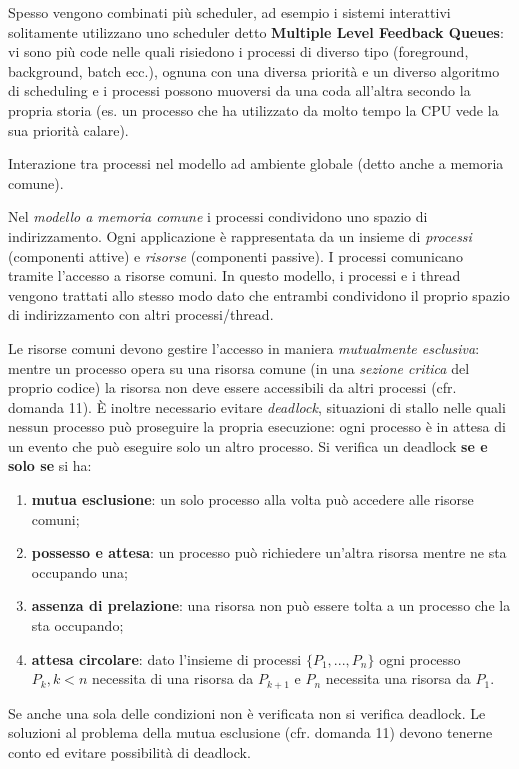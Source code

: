\documentclass[answers,a4paper,12pt]{exam}
\begin{document}
\begin{questions}
\begin{solutionorlines}[3.8in]
\begin{itemize}
\end{itemize}
Spesso vengono combinati più scheduler, ad esempio i sistemi interattivi solitamente utilizzano uno scheduler detto \textbf{Multiple Level Feedback Queues}: vi sono più code nelle quali risiedono i processi di diverso tipo (foreground, background, batch ecc.), ognuna con una diversa priorità e un diverso 
algoritmo di scheduling e i processi possono muoversi da una coda all'altra secondo la propria storia (es. un processo che ha utilizzato da molto tempo la  CPU vede la sua priorità calare).
\end{solutionorlines}

\question
Interazione tra processi nel modello ad ambiente globale (detto anche a memoria comune).
\begin{solutionorlines}[3.8in]
Nel \textit{modello a memoria comune} i processi condividono uno spazio di indirizzamento. Ogni applicazione è rappresentata da un insieme di \textit{processi} (componenti attive) e \textit{risorse} (componenti passive). I processi comunicano tramite l'accesso a risorse comuni. In questo modello, i processi e i thread vengono trattati allo stesso modo dato che entrambi condividono il proprio spazio di indirizzamento con altri processi/thread. 

Le risorse comuni devono gestire l'accesso in maniera \textit{mutualmente esclusiva}: mentre un processo opera su una risorsa comune (in una \textit{sezione critica} del proprio codice) la risorsa non deve essere accessibili da altri processi (cfr. domanda 11). È inoltre necessario evitare \textit{deadlock}, situazioni di stallo nelle quali nessun processo può proseguire la propria esecuzione: ogni processo è in attesa di un evento che può eseguire solo un altro processo. Si verifica un deadlock \textbf{se e solo se} si ha:
\begin{enumerate}
	\item \textbf{mutua esclusione}: un solo processo alla volta può accedere alle risorse comuni;
	\item \textbf{possesso e attesa}: un processo può richiedere un'altra risorsa mentre ne sta occupando una;
	\item \textbf{assenza di prelazione}: una risorsa non può essere tolta a un processo che la sta occupando;
	\item \textbf{attesa circolare}: dato l'insieme di processi $\{P_1, ..., P_n\}$ ogni processo $P_k, k < n$ necessita di una risorsa da $P_{k + 1}$ e $P_n$ necessita una risorsa da $P_1$.
\end{enumerate} 
Se anche una sola delle condizioni non è verificata non si verifica deadlock. Le soluzioni al problema della mutua esclusione (cfr. domanda 11) devono tenerne conto ed evitare possibilità di deadlock.
\end{solutionorlines}


\end{questions}
\end{document}
